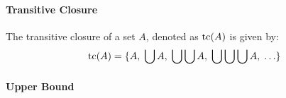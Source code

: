 \paragraph{Transitive Closure}
The transitive closure of a set $A$, denoted as $\operatorname{tc}(A)$ is given by:
\begin{equation}
\label{Eq:TransitiveClosure}
\operatorname{tc}(A) = \{A, \; 
           \bigcup A, \; 
           \bigcup \bigcup A, \;
           \bigcup \bigcup \bigcup A, \;
           \ldots  \}
\end{equation}















\paragraph{Upper Bound}




